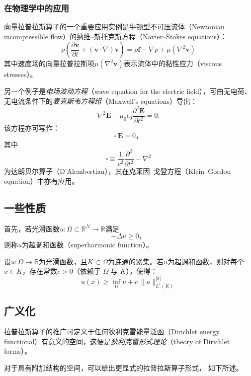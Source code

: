 \subsubsection{在物理学中的应用}
向量拉普拉斯算子的一个重要应用实例是牛顿型不可压流体（Newtonian incompressible flow）的纳维–斯托克斯方程（Navier–Stokes equations）：
\[
\rho \left(
  \frac{\partial \mathbf{v}}{\partial t}
  + (\mathbf{v} \cdot \nabla) \mathbf{v}
\right)
= \rho \mathbf{f}
- \nabla p
+ \mu (\nabla^{2} \mathbf{v})~
\]
其中速度场的向量拉普拉斯项$\mu (\nabla^{2} \mathbf{v})$表示流体中的黏性应力（viscous stresses）。

另一个例子是\emph{电场波动方程}（wave equation for the electric field），可由无电荷、无电流条件下的\emph{麦克斯韦方程组}（Maxwell’s equations）导出：
\[
\nabla^{2} \mathbf{E}
- \mu_{0} \epsilon_{0}
  \frac{\partial^{2} \mathbf{E}}{\partial t^{2}}
= 0.~
\]
该方程亦可写作：
\[
\square \, \mathbf{E} = 0，~
\]
其中
\[
\square \equiv \frac{1}{c^{2}} \frac{\partial^{2}}{\partial t^{2}} - \nabla^{2}~
\]
为达朗贝尔算子（D’Alembertian），其在克莱因–戈登方程（Klein–Gordon equation）中亦有应用。
\subsection{一些性质}
首先，若光滑函数$u : \Omega \subset \mathbb{R}^{N} \to \mathbb{R}$满足
\[
- \Delta u \geq 0，~
\]
则称$u$为超调和函数（superharmonic function）。

设$u : \Omega \to \mathbb{R}$为光滑函数，且$K \subset \Omega$为连通的紧集。若$u$为超调和函数，则对每个$x \in K$，存在常数$c > 0$（依赖于 $\Omega$ 与 $K$），使得：
\[
u(x) \geq \inf_{\Omega} u + c \, \lVert u \rVert_{L^{1}(K)}^\text{[8]}~
\]
\subsection{广义化}
拉普拉斯算子的推广可定义于任何狄利克雷能量泛函（Dirichlet energy functional）有意义的空间，这便是\emph{狄利克雷形式理论}（theory of Dirichlet forms）。

对于具有附加结构的空间，可以给出更显式的拉普拉斯算子形式，
如下所述。
